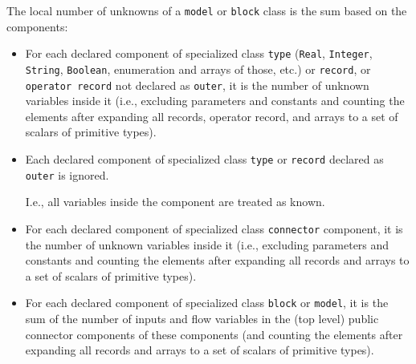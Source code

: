 \begin{definition}
The local number of unknowns of a \lstinline!model! or \lstinline!block! class is the sum based on the components:
\begin{itemize}
\item
  For each declared component of specialized class \lstinline!type! (\lstinline!Real!, \lstinline!Integer!, \lstinline!String!, \lstinline!Boolean!, enumeration and arrays of those, etc.) or \lstinline!record!, or \lstinline!operator record! not declared as \lstinline!outer!, it is the number of unknown variables inside it (i.e., excluding parameters and constants and counting the elements after expanding all records, operator record, and arrays to a set of scalars of primitive types).
\item
  Each declared component of specialized class \lstinline!type! or \lstinline!record! declared as \lstinline!outer! is ignored.
  \begin{nonnormative}
  I.e., all variables inside the component are treated as known.
  \end{nonnormative}
\item
  For each declared component of specialized class \lstinline!connector! component, it is the number of unknown variables inside it (i.e., excluding parameters and constants and counting the elements after expanding all records and arrays to a set of scalars of primitive types).
\item
  For each declared component of specialized class \lstinline!block! or \lstinline!model!, it is the sum of the number of inputs and flow variables in the (top level) public connector components of these components (and counting the elements after expanding all records and arrays to a set of scalars of primitive types).
\end{itemize}
\end{definition}

